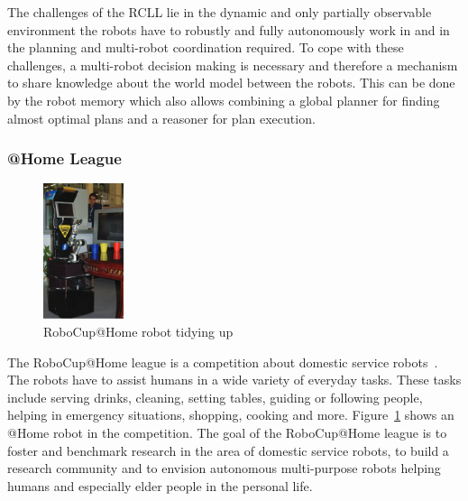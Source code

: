 \documentclass[a4paper,11pt]{article}
\newcommand{\reffig}[1]{Figure~\ref{#1}}
\begin{document}
The challenges of the RCLL lie in the dynamic and only partially
observable environment the robots have to robustly and fully
autonomously work in and in the planning and multi-robot coordination
required.
To cope with these challenges, a
multi-robot decision making is necessary and therefore a mechanism to
share knowledge about the world model between the robots. This can be
done by the robot memory which also allows combining a global planner
for finding almost optimal plans and a reasoner for plan execution.

\subsubsection{@Home League}
\begin{figure}
  \centering
  \includegraphics[height=150px]{img/ceasar}%
  \caption{RoboCup@Home robot tidying up~\cite{wisspeintner2009robocup}}
  \vspace{-2mm}
  \label{fig:athome}
\end{figure}

The RoboCup@Home league is a competition about domestic service
robots~\cite{wisspeintner2009robocup}. The robots have to assist
humans in a wide variety of everyday tasks. These tasks include
serving drinks, cleaning, setting tables, guiding or following people,
helping in emergency situations, shopping, cooking and
more. \reffig{fig:athome} shows an @Home robot in the
competition.
%
The goal of the RoboCup@Home league is to foster and benchmark
research in the area of domestic service robots, to build a research
community and to envision autonomous multi-purpose robots helping
humans and especially elder people in the personal life.
\end{document}
